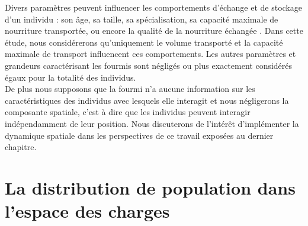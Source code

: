 Divers paramètres peuvent influencer les comportements d'échange et de stockage d'un individu : son âge, sa taille, sa spécialisation, sa capacité maximale de nourriture transportée, ou encore la qualité de la nourriture échangée \citep{buffin_trophallaxis_2010}. Dans cette étude, nous considérerons qu'uniquement le volume transporté et la capacité maximale de transport influencent ces comportements. Les autres paramètres et grandeurs caractérisant les fourmis sont négligés ou plus exactement considérés égaux pour la totalité des individus.\\ 

De plus nous supposons que la fourmi n'a aucune information sur les caractéristiques des individus avec lesquels elle interagit et nous négligerons la composante spatiale, c'est à dire que les individus peuvent interagir indépendamment de leur position. Nous discuterons de l'intérêt d'implémenter la dynamique spatiale dans les perspectives de ce travail exposées au dernier chapitre.


%
%
%


\section{La distribution de population dans l'espace des charges}

